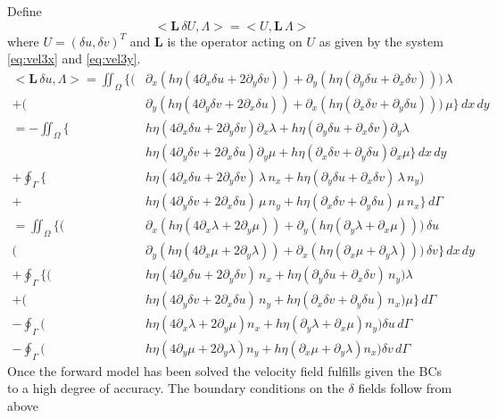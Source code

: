 \documentclass[10pt,a4paper]{book}
\newcommand{\p}{\partial}
\begin{document}
Define
\[
<\bm{L}\, \delta U , \Lambda> = < U , \bm{L}\, \Lambda>
\]
where $U=(\delta u,\delta v)^T$ and $\bm{L}$ is the operator acting on $U$ as given by the system \eqref{eq:vel3x} and \eqref{eq:vel3y}.
\begin{align*}
<\bm{L} \, \delta u , \Lambda > 
= \iint_{\Omega}   \big \{ ( &\p_x ( h \eta ( 4 \p_x \delta u + 2 \p_y \delta v)) + \p_y ( h \eta (\p_y \delta u + \p_x \delta v))) \, \lambda \\
                           +(&\p_y (  h \eta ( 4 \p_y \delta v + 2 \p_x \delta u )) +\p_x ( h \eta (\p_x \delta v + \p_y \delta u ))) \, \mu \big \} \, dx \, dy \\
 =  -\iint_{\Omega} \big \{ &h \eta ( 4 \p_x \delta u + 2 \p_y \delta v ) \p_x \lambda +  h \eta (\p_y \delta u + \p_x \delta v) \p_y \lambda  \\
                            &h \eta ( 4 \p_y \delta v + 2 \p_x \delta u ) \p_y \mu     +  h \eta (\p_x \delta v + \p_y \delta u) \p_x \mu \big \} \, dx \, dy \\
+ \oint_{\Gamma} \big \{ &h \eta ( 4\p_x \delta u + 2 \p_y \delta v) \, \lambda \, n_x +  h \eta (\p_y \delta u + \p_x \delta v) \, \lambda \, n_y )  \\
+                        &h \eta ( 4\p_y \delta v + 2 \p_x \delta u) \, \mu \, n_y     +  h \eta (\p_x \delta v + \p_y \delta u) \, \mu \, n_x   \big \} \, d\Gamma\\
=  \iint_{\Omega} \big \{ (&\p_x ( h \eta ( 4 \p_x \lambda + 2 \p_y \mu )) +  \p_y ( h \eta (\p_y \lambda + \p_x \mu))) \, \delta u \\
                          (&\p_y ( h \eta ( 4 \p_x \mu + 2 \p_y \lambda )) + \p_x  ( h \eta (\p_x \mu + \p_y \lambda)))  \, \delta v \big \} \, dx \, dy\\
+ \oint_{\Gamma} \big \{ (&h \eta ( 4\p_x \delta u + 2 \p_y \delta v)  \, n_x +  h \eta (\p_y \delta u + \p_x \delta v) \,  n_y ) \lambda  \\
+                        (&h \eta ( 4\p_y \delta v + 2 \p_x \delta u)  \, n_y +  h \eta (\p_x \delta v + \p_y \delta u) \,  n_x ) \mu  \big \} \, d\Gamma\\
  -\oint_{\Gamma} ( &h \eta ( 4 \p_x \lambda + 2 \p_y \mu )  n_x +   h \eta (\p_y \lambda + \p_x \mu) n_y ) \delta u \,d\Gamma \nonumber \\
  -\oint_{\Gamma} ( &h \eta ( 4 \p_y \mu + 2 \p_y \lambda )  n_y +   h \eta (\p_x \mu + \p_y \lambda)  n_x ) \delta v \, d\Gamma \nonumber 
\end{align*}
Once the forward model has been solved the velocity field fulfills given
the BCs to a high degree of accuracy.  The boundary conditions on
the $\delta$ fields follow from above
\end{document}
